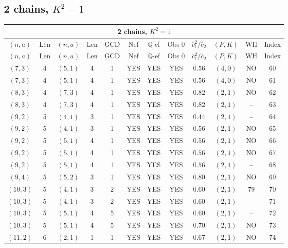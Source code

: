 \subsection{2 chains, $K^2 = 1$}
\begin{longtable}{|c|c|c|c|c|c|c|c|c|c|c|c|}
\hline
\multicolumn{12}{|c|}{2 chains, $K^2 = 1$}\\
\hline
$(n,a)$ & Len & $(n,a)$ & Len & GCD & Nef & $\mathbb Q$-ef & Obs 0 & $\overline c_1^2 / \overline c_2$ & $(P,K)$ & WH & Index\\
\hline
\endfirsthead

\hline
$(n,a)$ & Len & $(n,a)$ & Len & GCD & Nef & $\mathbb Q$-ef & Obs 0 & $\overline c_1^2 / \overline c_2$ & $(P,K)$ & WH & Index\\
\hline
\endhead
\hline
\endfoot

$(7,3)$ & 4 & $(5,1)$ & 4 & 1 & YES & YES & YES & $0.56$ & $(4,0)$ & NO & 60\\
$(7,3)$ & 4 & $(5,1)$ & 4 & 1 & YES & YES & YES & $0.56$ & $(4,0)$ & NO & 61\\
$(8,3)$ & 4 & $(7,3)$ & 4 & 1 & YES & YES & YES & $0.82$ & $(2,1)$ & NO & 62\\
$(8,3)$ & 4 & $(7,3)$ & 4 & 1 & YES & YES & YES & $0.82$ & $(2,1)$ & -- & 63\\
$(9,2)$ & 5 & $(4,1)$ & 3 & 1 & YES & YES & YES & $0.44$ & $(2,1)$ & -- & 64\\
$(9,2)$ & 5 & $(4,1)$ & 3 & 1 & YES & YES & YES & $0.56$ & $(2,1)$ & NO & 65\\
$(9,2)$ & 5 & $(5,1)$ & 4 & 1 & YES & YES & YES & $0.56$ & $(2,1)$ & NO & 66\\
$(9,2)$ & 5 & $(5,1)$ & 4 & 1 & YES & YES & YES & $0.56$ & $(2,1)$ & NO & 67\\
$(9,2)$ & 5 & $(5,1)$ & 4 & 1 & YES & YES & YES & $0.56$ & $(2,1)$ & -- & 68\\
$(9,4)$ & 5 & $(5,2)$ & 3 & 1 & YES & YES & YES & $0.80$ & $(2,1)$ & NO & 69\\
$(10,3)$ & 5 & $(4,1)$ & 3 & 2 & YES & YES & YES & $0.60$ & $(2,1)$ & 79 & 70\\
$(10,3)$ & 5 & $(4,1)$ & 3 & 2 & YES & YES & YES & $0.60$ & $(2,1)$ & -- & 71\\
$(10,3)$ & 5 & $(5,1)$ & 4 & 5 & YES & YES & YES & $0.60$ & $(2,1)$ & -- & 72\\
$(10,3)$ & 5 & $(5,1)$ & 4 & 5 & YES & YES & YES & $0.70$ & $(2,1)$ & NO & 73\\
$(11,2)$ & 6 & $(2,1)$ & 1 & 1 & YES & YES & YES & $0.67$ & $(2,1)$ & NO & 74\\

\end{longtable}
